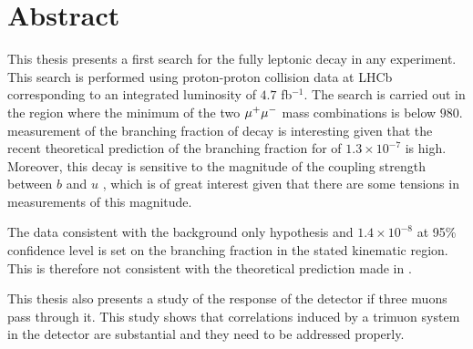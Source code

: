\chapter*{Abstract}
\noindent
This thesis presents a first search for the fully leptonic decay \Bmumumu in any experiment. This search is performed using
proton-proton collision data at LHCb corresponding to an integrated luminosity of $4.7$ fb$^{-1}$. The search is carried out in the
region where the minimum of the two ${\mu^+\mu^-}$ mass combinations is below $980$\mevcc. \DIFdelbegin {}\DIFdelend \DIFaddbegin {}\DIFaddend measurement of the branching fraction of decay is \DIFaddbegin {}\DIFaddend interesting given that the recent theoretical prediction \cite{Danilina:2018uzr} of the branching fraction for \Bmumumu of $1.3 \times 10^{-7}$ is high. Moreover, this decay is sensitive to the magnitude of the \DIFdelbegin {}\DIFdelend coupling strength between $b$ and $u$ \DIFdelbegin {}\DIFdelend \DIFaddbegin {}\DIFaddend , which is of great interest given that there are some tensions in measurements of this magnitude.

The data \DIFdelbegin {}\DIFdelend \DIFaddbegin {}\DIFaddend consistent with the background only hypothesis and \DIFdelbegin {}\DIFdelend \DIFaddbegin {}\DIFaddend $1.4 \times 10^{-8}$ at 95\% confidence level is set on the branching fraction in the stated kinematic region. This is therefore not consistent with the theoretical prediction made in \DIFaddbegin {}\DIFaddend \cite{Danilina:2018uzr}.

This thesis also presents a study of the response of the detector if three muons pass through it. This study shows that correlations induced by a trimuon system in the detector are substantial and they need to be addressed properly.



